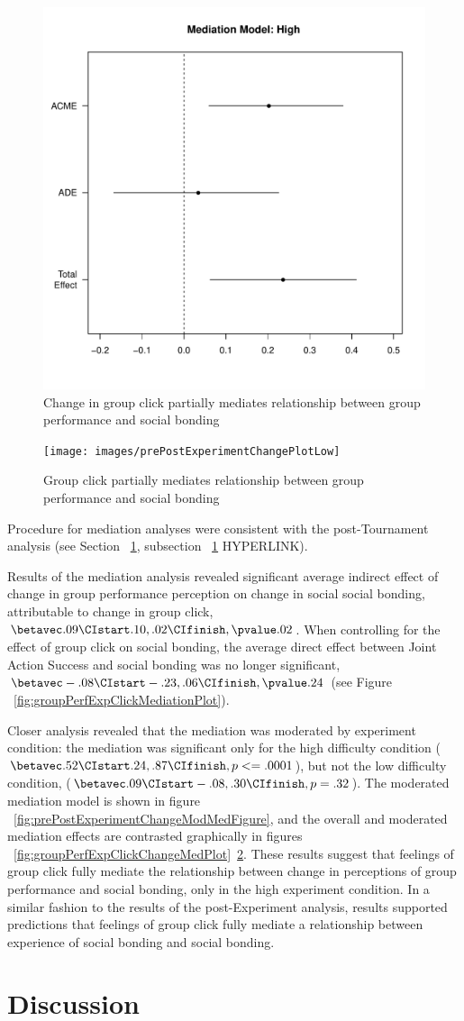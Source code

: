 \begin{figure}
  \centering
  \includegraphics[width=0.5\linewidth,keepaspectratio] {images/groupPerfClickChangeMedPlotHigh}
  \caption{Change in group click partially mediates relationship between group performance and social bonding}
  \label{fig:groupPerfClickChangeMedPlotHigh}
\end{figure}

\begin{figure}
  \centering
  \texttt{[image: images/prePostExperimentChangePlotLow]}
  \caption{Group click partially mediates relationship between group performance and social bonding}
  \label{fig:prePostExperimentChangePlotLow}
\end{figure}


Procedure for mediation analyses were consistent with the post-Tournament analysis (see Section ~\ref{}, subsection ~\ref{} HYPERLINK).

Results of the mediation analysis revealed significant average indirect effect of change in group performance perception on change in social social bonding, attributable to change in group click, $\betavec.09 \CIstart .10, .02 \CIfinish, \pvalue .02$.  When controlling for the effect of group click on social bonding, the average direct effect between Joint Action Success and social bonding was no longer significant, $\betavec -.08 \CIstart -.23, .06 \CIfinish, \pvalue .24$  (see Figure ~\ref{fig:groupPerfExpClickMediationPlot}).



Closer analysis revealed that the mediation was moderated by experiment condition: the mediation was significant only for the high difficulty condition ($\betavec .52 \CIstart .24, .87 \CIfinish, p <=.0001$), but not the low difficulty condition, ($\betavec .09 \CIstart -.08, .30 \CIfinish, p =.32$). The moderated mediation model is shown in figure ~\ref{fig:prePostExperimentChangeModMedFigure}, and the overall and moderated mediation effects are contrasted graphically in figures ~\ref{fig:groupPerfExpClickChangeMedPlot}\nobreakdash~\ref{fig:prePostExperimentChangePlotLow}.  These results suggest that feelings of group click fully mediate the relationship between change in perceptions of group performance and social bonding, only in the high experiment condition.  In a similar fashion to the results of the post-Experiment analysis, results supported predictions that feelings of group click fully mediate a relationship between experience of social bonding and social bonding.




\section{Discussion}
